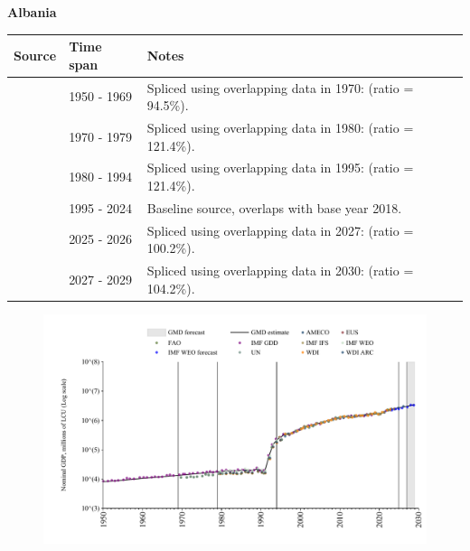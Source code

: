 \documentclass[12pt,a4paper,landscape]{article}
\begin{document}
\begin{adjustbox}{max totalsize={\paperwidth}{\paperheight},center}
\begin{minipage}[t][\textheight][t]{\textwidth}
\vspace*{0.5cm}
{}
\begin{center}
{\Large\bfseries Albania}
\end{center}
\vspace{0.5cm}
\begin{table}[H]
\centering
\small
\begin{tabular}{|l|l|l|}
\hline
\textbf{Source} & \textbf{Time span} & \textbf{Notes} \\
\hline
\rowcolor{white}\cite{IMF_GDD}& 1950 - 1969 &Spliced using overlapping data in 1970: (ratio = 94.5\%).\\
\rowcolor{lightgray}\cite{UN}& 1970 - 1979 &Spliced using overlapping data in 1980: (ratio = 121.4\%).\\
\rowcolor{white}\cite{WDI}& 1980 - 1994 &Spliced using overlapping data in 1995: (ratio = 121.4\%).\\
\rowcolor{lightgray}\cite{EUS}& 1995 - 2024 &Baseline source, overlaps with base year 2018.\\
\rowcolor{white}\cite{AMECO}& 2025 - 2026 &Spliced using overlapping data in 2027: (ratio = 100.2\%).\\
\rowcolor{lightgray}\cite{IMF_WEO_forecast}& 2027 - 2029 &Spliced using overlapping data in 2030: (ratio = 104.2\%).\\
\hline
\end{tabular}
\end{table}
\begin{figure}[H]
\centering
\includegraphics[width=\textwidth,height=0.6\textheight,keepaspectratio]{graphs/ALB_nGDP.pdf}
\end{figure}
\end{minipage}
\end{adjustbox}
\end{document}
